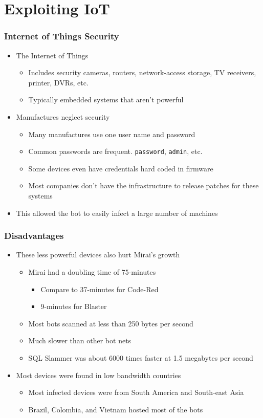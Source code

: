 \documentclass{beamer}
\begin{document}
\section{Exploiting IoT}

\begin{frame}[fragile]
	\frametitle{Internet of Things Security}
	\begin{itemize}
		\item<+-> The Internet of Things
		\begin{itemize}
			\item<+-> Includes security cameras, routers, network-access storage, TV receivers, printer, DVRs, etc.
			\item<+-> Typically embedded systems that aren't powerful
		\end{itemize}
		\item<+-> Manufactures neglect security
		\begin{itemize}
			\item<+-> Many manufactures use one user name and password
			\item<+-> Common passwords are frequent. \verb|password|, \verb|admin|, etc.
			\item<+-> Some devices even have credentials hard coded in firmware
			\item<+-> Most companies don't have the infrastructure to release patches for these systems
		\end{itemize}
		\item<+-> This allowed the bot to easily infect a large number of machines
	\end{itemize}
\end{frame}

\begin{frame}
	\frametitle{Disadvantages}
	\begin{itemize}
		\item<+-> These less powerful devices also hurt Mirai's growth
		\begin{itemize}
			\item<+-> Mirai had a doubling time of 75-minutes
			\begin{itemize}
				\item<+-> Compare to 37-minutes for Code-Red
				\item<+-> 9-minutes for Blaster
			\end{itemize}
			\item<+-> Most bots scanned at less than 250 bytes per second
			\item<+-> Much slower than other bot nets
			\item<+-> SQL Slammer was about 6000 times faster at 1.5 megabytes per second
		\end{itemize}
		\item<+-> Most devices were found in low bandwidth countries
		\begin{itemize}
			\item<+-> Most infected devices were from South America and South-east Asia
			\item<+-> Brazil, Colombia, and Vietnam hosted most of the bots
		\end{itemize}
	\end{itemize}
\end{frame}
\end{document}

